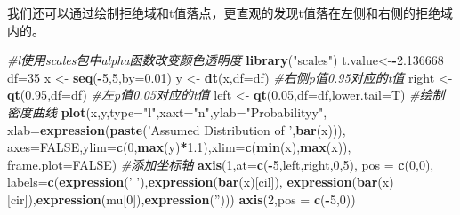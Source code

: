\documentclass[
]{article}
\newenvironment{Shaded}{\begin{snugshade}}{\end{snugshade}}
\newcommand{\CommentTok}[1]{\textcolor[rgb]{0.56,0.35,0.01}{\textit{#1}}}
\newcommand{\DataTypeTok}[1]{\textcolor[rgb]{0.13,0.29,0.53}{#1}}
\newcommand{\DecValTok}[1]{\textcolor[rgb]{0.00,0.00,0.81}{#1}}
\newcommand{\FloatTok}[1]{\textcolor[rgb]{0.00,0.00,0.81}{#1}}
\newcommand{\KeywordTok}[1]{\textcolor[rgb]{0.13,0.29,0.53}{\textbf{#1}}}
\newcommand{\NormalTok}[1]{#1}
\newcommand{\OperatorTok}[1]{\textcolor[rgb]{0.81,0.36,0.00}{\textbf{#1}}}
\newcommand{\OtherTok}[1]{\textcolor[rgb]{0.56,0.35,0.01}{#1}}
\newcommand{\StringTok}[1]{\textcolor[rgb]{0.31,0.60,0.02}{#1}}
\begin{document}
我们还可以通过绘制拒绝域和t值落点，更直观的发现t值落在左侧和右侧的拒绝域内的。

\begin{Shaded}
\begin{Highlighting}[]
\CommentTok{#l使用scales包中alpha函数改变颜色透明度}
\KeywordTok{library}\NormalTok{(}\StringTok{"scales"}\NormalTok{)}
\NormalTok{t.value<-}\OperatorTok{-}\FloatTok{2.136668}
\NormalTok{df=}\DecValTok{35}
\NormalTok{x <-}\StringTok{ }\KeywordTok{seq}\NormalTok{(}\OperatorTok{-}\DecValTok{5}\NormalTok{,}\DecValTok{5}\NormalTok{,}\DataTypeTok{by=}\FloatTok{0.01}\NormalTok{)}
\NormalTok{y <-}\StringTok{ }\KeywordTok{dt}\NormalTok{(x,}\DataTypeTok{df=}\NormalTok{df)}
\CommentTok{#右侧p值0.95对应的t值}
\NormalTok{right <-}\StringTok{ }\KeywordTok{qt}\NormalTok{(}\FloatTok{0.95}\NormalTok{,}\DataTypeTok{df=}\NormalTok{df)}
\CommentTok{#左p值0.05对应的t值}
\NormalTok{left <-}\StringTok{ }\KeywordTok{qt}\NormalTok{(}\FloatTok{0.05}\NormalTok{,}\DataTypeTok{df=}\NormalTok{df,}\DataTypeTok{lower.tail=}\NormalTok{T)}
\CommentTok{#绘制密度曲线}
\KeywordTok{plot}\NormalTok{(x,y,}\DataTypeTok{type=}\StringTok{"l"}\NormalTok{,}\DataTypeTok{xaxt=}\StringTok{"n"}\NormalTok{,}\DataTypeTok{ylab=}\StringTok{"Probabilityy"}\NormalTok{,}
     \DataTypeTok{xlab=}\KeywordTok{expression}\NormalTok{(}\KeywordTok{paste}\NormalTok{(}\StringTok{'Assumed Distribution of '}\NormalTok{,}\KeywordTok{bar}\NormalTok{(x))),}
     \DataTypeTok{axes=}\OtherTok{FALSE}\NormalTok{,}\DataTypeTok{ylim=}\KeywordTok{c}\NormalTok{(}\DecValTok{0}\NormalTok{,}\KeywordTok{max}\NormalTok{(y)}\OperatorTok{*}\FloatTok{1.1}\NormalTok{),}\DataTypeTok{xlim=}\KeywordTok{c}\NormalTok{(}\KeywordTok{min}\NormalTok{(x),}\KeywordTok{max}\NormalTok{(x)),}
     \DataTypeTok{frame.plot=}\OtherTok{FALSE}\NormalTok{)}
\CommentTok{#添加坐标轴}
\KeywordTok{axis}\NormalTok{(}\DecValTok{1}\NormalTok{,}\DataTypeTok{at=}\KeywordTok{c}\NormalTok{(}\OperatorTok{-}\DecValTok{5}\NormalTok{,left,right,}\DecValTok{0}\NormalTok{,}\DecValTok{5}\NormalTok{),}
     \DataTypeTok{pos =} \KeywordTok{c}\NormalTok{(}\DecValTok{0}\NormalTok{,}\DecValTok{0}\NormalTok{),}
     \DataTypeTok{labels=}\KeywordTok{c}\NormalTok{(}\KeywordTok{expression}\NormalTok{(}\StringTok{' '}\NormalTok{),}\KeywordTok{expression}\NormalTok{(}\KeywordTok{bar}\NormalTok{(x)[cil]),}
     \KeywordTok{expression}\NormalTok{(}\KeywordTok{bar}\NormalTok{(x)[cir]),}\KeywordTok{expression}\NormalTok{(mu[}\DecValTok{0}\NormalTok{]),}\KeywordTok{expression}\NormalTok{(}\StringTok{''}\NormalTok{)))}
\KeywordTok{axis}\NormalTok{(}\DecValTok{2}\NormalTok{,}\DataTypeTok{pos =} \KeywordTok{c}\NormalTok{(}\OperatorTok{-}\DecValTok{5}\NormalTok{,}\DecValTok{0}\NormalTok{))}

\end{Highlighting}
\end{Shaded}
\end{document}
